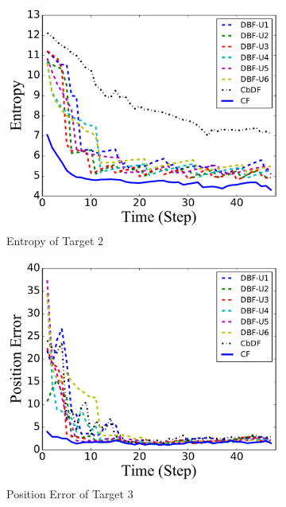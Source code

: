 \begin{figure}
\begin{subfigure}[b]{0.23\textwidth}
			\includegraphics[width=\textwidth]{figures/hetero_mov_sen_mov_tar_entropy_noise_circle}
			\caption{Entropy of Target $2$}\label{fig:cir_ent}
		\end{subfigure}			
		\begin{subfigure}[b]{0.23\textwidth}
			\includegraphics[width=\textwidth]{figures/hetero_mov_sen_mov_tar_pos_err_noise_sin}
			\caption{Position Error of Target $3$}\label{fig:sin_pos_err}
		\end{subfigure}
		\begin{subfigure}[b]{0.23\textwidth}

\end{subfigure}
\end{figure}
